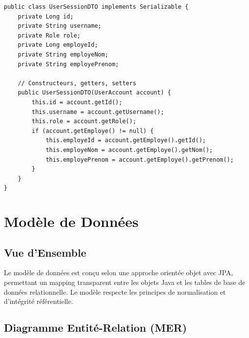 \documentclass[12pt,a4paper,twoside]{report}
\begin{document}
\begin{lstlisting}[caption=DTO pour la session, label=lst:dto]
public class UserSessionDTO implements Serializable {
    private Long id;
    private String username;
    private Role role;
    private Long employeId;
    private String employeNom;
    private String employePrenom;
    
    // Constructeurs, getters, setters
    public UserSessionDTO(UserAccount account) {
        this.id = account.getId();
        this.username = account.getUsername();
        this.role = account.getRole();
        if (account.getEmploye() != null) {
            this.employeId = account.getEmploye().getId();
            this.employeNom = account.getEmploye().getNom();
            this.employePrenom = account.getEmploye().getPrenom();
        }
    }
}
\end{lstlisting}

\chapter{Modèle de Données}

\section{Vue d'Ensemble}

Le modèle de données est conçu selon une approche orientée objet avec JPA, permettant un mapping transparent entre les objets Java et les tables de base de données relationnelle. Le modèle respecte les principes de normalisation et d'intégrité référentielle.

\section{Diagramme Entité-Relation (MER)}
\end{document}
